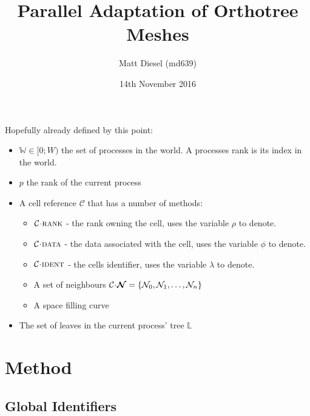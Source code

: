 \documentclass{IIBproject}
\newcommand{\vect}[1]{\bm{#1}}
\newcommand{\acc}{{\mkern 0.5mu\cdot\mkern 0.5mu}}
\begin{document}
\date{14th November 2016}
\author{Matt Diesel (md639)}
\title{Parallel Adaptation of Orthotree Meshes}



\pagestyle{plain}



Hopefully already defined by this point:

\begin{itemize}
	\item $\mathbb{W} \in [0;W)$ the set of processes in the world. A processes rank is its index in the world.
	\item $p$ the rank of the current process
	\item A cell reference $\mathcal{C}$ that has a number of methods:
	\begin{itemize}
		\item $\mathcal{C}\acc\textproc{rank}$ - the rank owning the cell, uses the variable $\rho$ to denote.
		\item $\mathcal{C}\acc\textproc{data}$ - the data associated with the cell, uses the variable $\phi$ to denote.
		\item $\mathcal{C}\acc\textproc{ident}$ - the cells identifier, uses the variable $\lambda$ to denote. 
		\item A set of neighbours $\mathcal{C}\acc\vect{\mathcal{N}} = \{\mathcal{N}_0 , \mathcal{N}_1, \dots , \mathcal{N}_n\}$
		\item A space filling curve
	\end{itemize}
	\item The set of leaves in the current process' tree $\mathbb{L}$
\end{itemize}


\section{Method}

\subsection{Global Identifiers}
\end{document}
